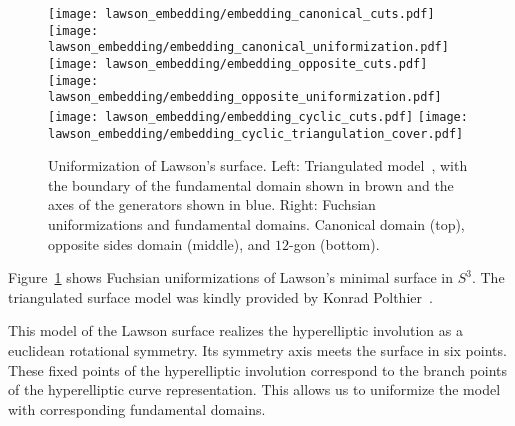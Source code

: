 \documentclass[Thesis]{subfiles}
\begin{document}
\begin{figure}
	\centering
	\resizebox{!}{6.3cm} {
	\texttt{[image: lawson\_embedding/embedding\_canonical\_cuts.pdf]}
	\texttt{[image: lawson\_embedding/embedding\_canonical\_uniformization.pdf]}
	}
	\resizebox{!}{6.3cm} {
	\texttt{[image: lawson\_embedding/embedding\_opposite\_cuts.pdf]}
	\texttt{[image: lawson\_embedding/embedding\_opposite\_uniformization.pdf]}
	}
	\resizebox{!}{6.6cm} {
	\texttt{[image: lawson\_embedding/embedding\_cyclic\_cuts.pdf]}
	\hspace{4mm}
	\texttt{[image: lawson\_embedding/embedding\_cyclic\_triangulation\_cover.pdf]}
	}
	\caption{Uniformization of Lawson's surface. Left:
          Triangulated model~\cite{polthier97}, with the boundary of
          the fundamental domain shown in brown and the axes of the
          generators shown in blue. Right: Fuchsian uniformizations and
          fundamental domains. Canonical domain (top), opposite sides
          domain (middle), and $12$-gon (bottom).}
	\label{fig:lawson_embedding}
\end{figure}

Figure~\ref{fig:lawson_embedding} shows Fuchsian uniformizations of
Lawson's minimal surface in $S^{3}$. The triangulated surface
model was kindly provided by Konrad Polthier~\cite{polthier97}.

This model of the Lawson surface realizes the hyperelliptic involution
as a euclidean rotational symmetry.  Its symmetry axis meets the
surface in six points. These fixed points of the hyperelliptic
involution correspond to the branch points of the hyperelliptic curve
representation. This allows us to uniformize the model with
corresponding fundamental domains. 

\end{document}
